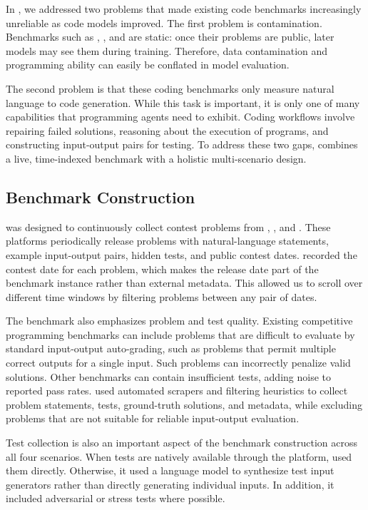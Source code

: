 

In \livecodebench{}, we addressed two problems that made existing code benchmarks
increasingly unreliable as code models improved. The first problem is
contamination. Benchmarks such as \humaneval{}, \mbpp{}, and \apps{} are
static: once their problems are public, later models may see them during training.
Therefore, data contamination and programming ability can easily be conflated in model evaluation.

The second problem is that these coding benchmarks only measure natural language
to code generation. While this task is important, it is only one of many capabilities
that programming agents need to exhibit. Coding workflows involve repairing failed solutions,
reasoning about the execution of programs, and constructing input-output pairs for testing. To address these two gaps, \livecodebench{} combines a live, time-indexed benchmark
with a holistic multi-scenario design.

\subsection{Benchmark Construction}
\livecodebench{} was designed to continuously collect contest problems from \leetcode{},
\atcoder{}, and \codeforces{}. These platforms periodically release problems
with natural-language statements, example input-output pairs, hidden tests, and
public contest dates. \livecodebench{} recorded the contest date for each
problem, which makes the release date part of the benchmark instance rather
than external metadata. This allowed us to scroll over different time windows by filtering problems
between any pair of dates.

The benchmark also emphasizes problem and test quality. Existing competitive
programming benchmarks can include problems that are difficult to evaluate by
standard input-output auto-grading, such as problems that permit multiple
correct outputs for a single input. Such problems can incorrectly penalize
valid solutions. Other benchmarks can contain insufficient tests, adding noise
to reported pass rates. \livecodebench{} used automated scrapers and filtering
heuristics to collect problem statements, tests, ground-truth solutions, and
metadata, while excluding problems that are not suitable for reliable
input-output evaluation.

Test collection is also an important aspect of the benchmark construction across all
four scenarios. When tests are natively available through the platform, \livecodebench{}
used them directly. Otherwise, it used a language model to synthesize test
input generators rather than directly generating individual inputs. In addition, it
included adversarial or stress tests where possible.

